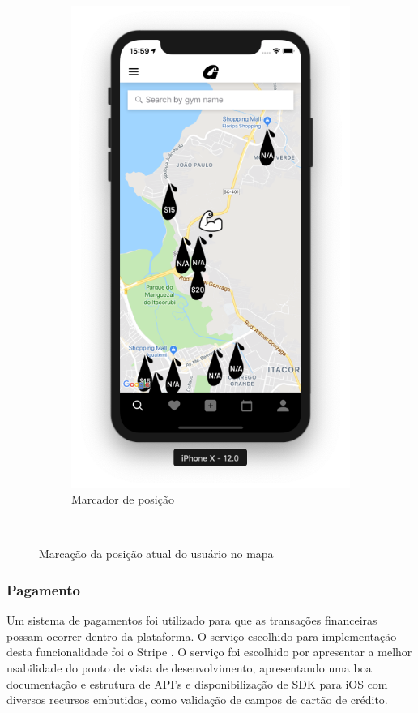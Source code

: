 \begin{figure}[H]
\begin{subfigure}[b]{0.4\textwidth}
        \includegraphics[width=\textwidth]{pfc/figuras/tr-home.png}
        \caption{Marcador de posição}
        \label{fig:muscle-marker}
    \end{subfigure}
    ~
    \caption{Marcação da posição atual do usuário no mapa}
    \label{fig:user-position}
\end{figure}

\subsubsection{Pagamento}
Um sistema de pagamentos foi utilizado para que as transações financeiras possam ocorrer dentro da plataforma. O serviço escolhido para implementação desta funcionalidade foi o Stripe \cite{stripe}. O serviço foi escolhido por apresentar a melhor usabilidade do ponto de vista de desenvolvimento, apresentando uma boa documentação e estrutura de API's e disponibilização de SDK para iOS com diversos recursos embutidos, como validação de campos de cartão de crédito.

